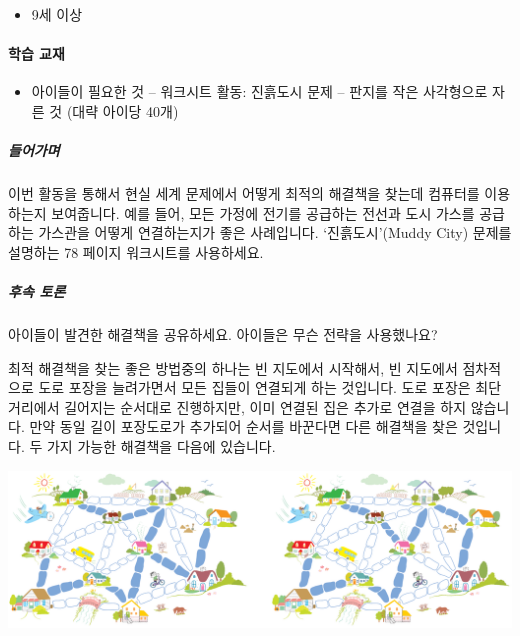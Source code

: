 \documentclass[]{article}
\begin{document}
\begin{itemize}
\itemsep1pt\parskip0pt
\item
  9세 이상
\end{itemize}

\mbox{}\paragraph{학습 교재}\label{section-126}

\begin{itemize}
\itemsep1pt\parskip0pt
\item
  아이들이 필요한 것 -- 워크시트 활동: 진흙도시 문제 -- 판지를 작은
  사각형으로 자른 것 (대략 아이당 40개)
\end{itemize}


\subparagraph{들어가며}\label{section-127}

이번 활동을 통해서 현실 세계 문제에서 어떻게 최적의 해결책을 찾는데
컴퓨터를 이용하는지 보여줍니다. 예를 들어, 모든 가정에 전기를 공급하는
전선과 도시 가스를 공급하는 가스관을 어떻게 연결하는지가 좋은
사례입니다. `진흙도시'(Muddy City) 문제를 설명하는 78 페이지 워크시트를
사용하세요.

\subparagraph{후속 토론}\label{section-128}

아이들이 발견한 해결책을 공유하세요. 아이들은 무슨 전략을 사용했나요?

최적 해결책을 찾는 좋은 방법중의 하나는 빈 지도에서 시작해서, 빈
지도에서 점차적으로 도로 포장을 늘려가면서 모든 집들이 연결되게 하는
것입니다. 도로 포장은 최단 거리에서 길어지는 순서대로 진행하지만, 이미
연결된 집은 추가로 연결을 하지 않습니다. 만약 동일 길이 포장도로가
추가되어 순서를 바꾼다면 다른 해결책을 찾은 것입니다. 두 가지 가능한
해결책을 다음에 있습니다.

\includegraphics{csunplugged/02-part/img/ch09-spanning-tree/09-spanning-tree-01-muddy-city-sol.png}
\end{document}

